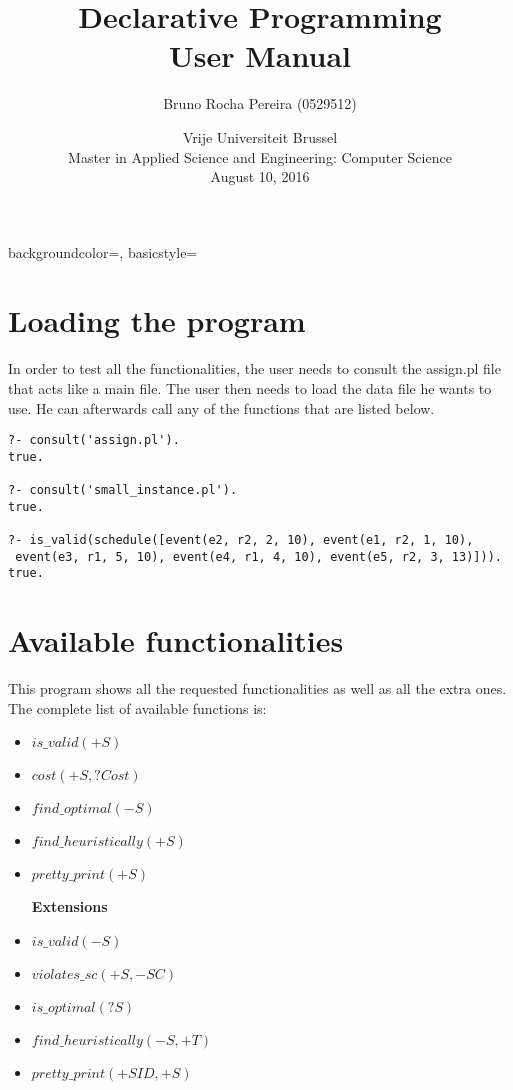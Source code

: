 \documentclass[a4paper]{article}
\title{Declarative Programming \\ User Manual}
\author{ Bruno Rocha Pereira (0529512)}
\date{Vrije Universiteit Brussel\\Master in Applied Science and Engineering: Computer Science\\ August 10, 2016}
\begin{document}
\maketitle
{}
{
    backgroundcolor=\color{black},
    basicstyle=\scriptsize\color{white}\ttfamily
}

\section{Loading the program}
In order to test all the functionalities, the user needs to consult the assign.pl file that acts like a main file. The user then needs to load the data file he wants to use. He can afterwards call any of the functions that are listed below.
\begin{lstlisting}[style=Linux]
?- consult('assign.pl').
true.

?- consult('small_instance.pl').
true.

?- is_valid(schedule([event(e2, r2, 2, 10), event(e1, r2, 1, 10),
 event(e3, r1, 5, 10), event(e4, r1, 4, 10), event(e5, r2, 3, 13)])).
true.

\end{lstlisting}
\section{Available functionalities}
This program shows all the requested functionalities as well as all the extra ones. The complete list of available functions is:
\begin{itemize}
\item $is\_valid(+S)$
\item $cost(+S, ?Cost)$
\item $find\_optimal(-S)$
\item $find\_heuristically(+S)$
\item $pretty\_print(+S)$

\textbf{Extensions}

\item $is\_valid(-S)$
\item $violates\_sc(+S, -SC)$
\item $is\_optimal(?S)$
\item $find\_heuristically(-S, +T)$
\item $pretty\_print(+SID, +S)$
\end{itemize}
\end{document}
